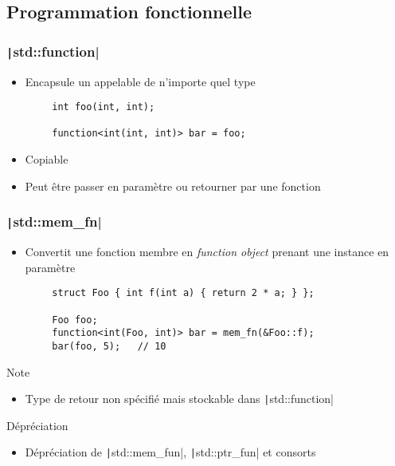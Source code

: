 \documentclass[C++.tex]{subfiles}
\begin{document}
\subsection*{Programmation fonctionnelle}
\begin{frame}[fragile]
	\frametitle{\texttt|std::function|}

	\begin{itemize}
		\item Encapsule un appelable de n'importe quel type
	\end{itemize}

	\begin{verbatim}
		int foo(int, int);

		function<int(int, int)> bar = foo;
	\end{verbatim}

	\begin{itemize}
		\item Copiable
		\item Peut être passer en paramètre ou retourner par une fonction
	\end{itemize}
\end{frame}

\begin{frame}[fragile]
	\frametitle{\texttt|std::mem_fn|}
	\begin{itemize}
		\item Convertit une fonction membre en \textit{function object} prenant une instance en paramètre
	\end{itemize}

	\begin{verbatim}
		struct Foo { int f(int a) { return 2 * a; } };

		Foo foo;
		function<int(Foo, int)> bar = mem_fn(&Foo::f);
		bar(foo, 5);   // 10
	\end{verbatim}

	\begin{block}{Note}
		\begin{itemize}
			\item Type de retour non spécifié mais stockable dans \texttt|std::function|
		\end{itemize}
	\end{block}

	\begin{block}{Dépréciation}
		\begin{itemize}
			\item Dépréciation de \texttt|std::mem_fun|, \texttt|std::ptr_fun| et consorts
		\end{itemize}

	\end{block}
\end{frame}
\end{document}
